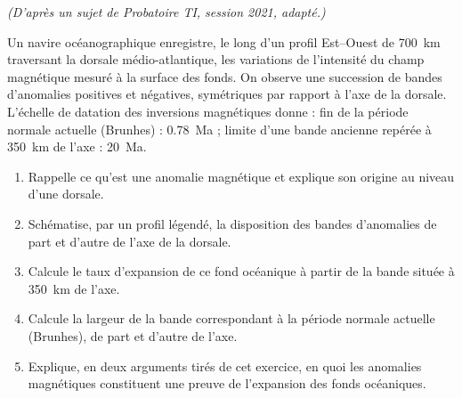 \documentclass[11pt]{article}
\begin{document}
\begin{exercice}
\textit{(D'après un sujet de Probatoire TI, session 2021, adapté.)}

Un navire océanographique enregistre, le long d'un profil Est--Ouest de \SI{700}{km} traversant la dorsale médio-atlantique, les variations de l'intensité du champ magnétique mesuré à la surface des fonds. On observe une succession de bandes d'anomalies positives et négatives, symétriques par rapport à l'axe de la dorsale. L'échelle de datation des inversions magnétiques donne : fin de la période normale actuelle (Brunhes) : \SI{0,78}{Ma} ; limite d'une bande ancienne repérée à \SI{350}{km} de l'axe : \SI{20}{Ma}.
\begin{enumerate}
\item Rappelle ce qu'est une anomalie magnétique et explique son origine au niveau d'une dorsale.
\item Schématise, par un profil légendé, la disposition des bandes d'anomalies de part et d'autre de l'axe de la dorsale.
\item Calcule le taux d'expansion de ce fond océanique à partir de la bande située à \SI{350}{km} de l'axe.
\item Calcule la largeur de la bande correspondant à la période normale actuelle (Brunhes), de part et d'autre de l'axe.
\item Explique, en deux arguments tirés de cet exercice, en quoi les anomalies magnétiques constituent une preuve de l'expansion des fonds océaniques.
\end{enumerate}
\end{exercice}
\end{document}
